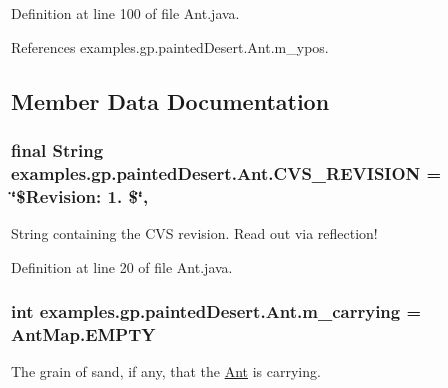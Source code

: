 Definition at line 100 of file Ant.\-java.



References examples.\-gp.\-painted\-Desert.\-Ant.\-m\-\_\-ypos.



\subsection{Member Data Documentation}
\hypertarget{classexamples_1_1gp_1_1painted_desert_1_1_ant_a7d597823cf1b07d70454c15ded3f094a}{
\subsubsection[{C\-V\-S\-\_\-\-R\-E\-V\-I\-S\-I\-O\-N}]{\setlength{\rightskip}{0pt plus 5cm}final String examples.\-gp.\-painted\-Desert.\-Ant.\-C\-V\-S\-\_\-\-R\-E\-V\-I\-S\-I\-O\-N = \char`\"{}\$Revision\-: 1. \$\char`\"{}\hspace{0.3cm}{\ttfamily [static]}, {\ttfamily [private]}}}\label{classexamples_1_1gp_1_1painted_desert_1_1_ant_a7d597823cf1b07d70454c15ded3f094a}
String containing the C\-V\-S revision. Read out via reflection! 

Definition at line 20 of file Ant.\-java.

\hypertarget{classexamples_1_1gp_1_1painted_desert_1_1_ant_aeff0963729db42464f91adbb003a7454}{
\subsubsection[{m\-\_\-carrying}]{\setlength{\rightskip}{0pt plus 5cm}int examples.\-gp.\-painted\-Desert.\-Ant.\-m\-\_\-carrying = {\bf Ant\-Map.\-E\-M\-P\-T\-Y}\hspace{0.3cm}{\ttfamily [private]}}}\label{classexamples_1_1gp_1_1painted_desert_1_1_ant_aeff0963729db42464f91adbb003a7454}
The grain of sand, if any, that the \hyperlink{classexamples_1_1gp_1_1painted_desert_1_1_ant}{Ant} is carrying. 


